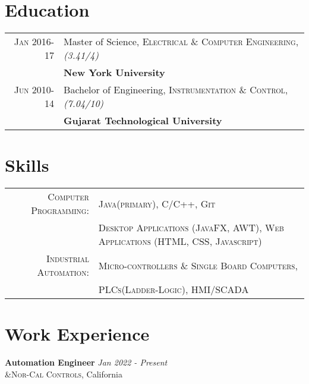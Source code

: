 \documentclass[a4paper,10pt]{article}
\begin{document}
\section{Education}
\begin{tabular}{rl}
\small{}\textsc{Jan 2016-17} & Master of Science, \textsc{ Electrical \& Computer Engineering}, \emph {(3.41/4)}\\
 & \small{}\textbf{New York University}\\
 \small{}\textsc{Jun 2010-14} & Bachelor of Engineering, \textsc{Instrumentation \& Control}, \emph {(7.04/10)}\\
 & \small{}\textbf{Gujarat Technological University}
\end{tabular}

\section{Skills}
\begin{tabular}{rl}	\small{}
 \small{}\textsc{Computer Programming:} & \small{}\textsc{Java(primary)}, \textsc{C/C++}, \textsc{Git}\\
  & \small{}\textsc{Desktop Applications (JavaFX, AWT)}, \textsc{Web Applications (HTML, CSS, Javascript)}\\
  
 \small{}\textsc{Industrial Automation:} & \small{}\textsc{Micro-controllers \& Single Board Computers},\\%
 & \textsc{PLCs(Ladder-Logic)}, \textsc{HMI/SCADA}\\
\end{tabular}

\section{Work Experience}

\textbf{Automation Engineer} \hfill \emph {Jan 2022 - Present}\\
 &\textsc{Nor-Cal Controls}, California
\end{document}
